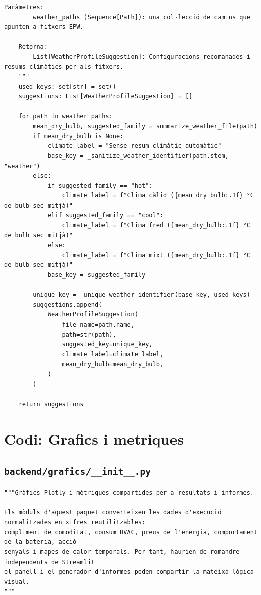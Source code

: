 \documentclass[10pt,a4paper]{article}
\begin{document}
\begin{lstlisting}[style=studioPython,caption={backend/weather\_profiles.py},label={lst:backend-weather-profiles-py}]
    Paràmetres:
        weather_paths (Sequence[Path]): una col·lecció de camins que apunten a fitxers EPW.

    Retorna:
        List[WeatherProfileSuggestion]: Configuracions recomanades i resums climàtics per als fitxers.
    """
    used_keys: set[str] = set()
    suggestions: List[WeatherProfileSuggestion] = []

    for path in weather_paths:
        mean_dry_bulb, suggested_family = summarize_weather_file(path)
        if mean_dry_bulb is None:
            climate_label = "Sense resum climàtic automàtic"
            base_key = _sanitize_weather_identifier(path.stem, "weather")
        else:
            if suggested_family == "hot":
                climate_label = f"Clima càlid ({mean_dry_bulb:.1f} °C de bulb sec mitjà)"
            elif suggested_family == "cool":
                climate_label = f"Clima fred ({mean_dry_bulb:.1f} °C de bulb sec mitjà)"
            else:
                climate_label = f"Clima mixt ({mean_dry_bulb:.1f} °C de bulb sec mitjà)"
            base_key = suggested_family

        unique_key = _unique_weather_identifier(base_key, used_keys)
        suggestions.append(
            WeatherProfileSuggestion(
                file_name=path.name,
                path=str(path),
                suggested_key=unique_key,
                climate_label=climate_label,
                mean_dry_bulb=mean_dry_bulb,
            )
        )

    return suggestions
\end{lstlisting}

\section{Codi: Grafics i metriques}


\subsection{\texorpdfstring{\texttt{backend/grafics/\_\_init\_\_.py}}{backend/grafics/\_\_init\_\_.py}}

\begin{lstlisting}[style=studioPython,caption={backend/grafics/\_\_init\_\_.py},label={lst:backend-grafics---init---py}]
"""Gràfics Plotly i mètriques compartides per a resultats i informes.

Els mòduls d'aquest paquet converteixen les dades d'execució normalitzades en xifres reutilitzables:
compliment de comoditat, consum HVAC, preus de l'energia, comportament de la bateria, acció
senyals i mapes de calor temporals. Per tant, haurien de romandre independents de Streamlit
el panell i el generador d'informes poden compartir la mateixa lògica visual.
"""
\end{lstlisting}
\end{document}
